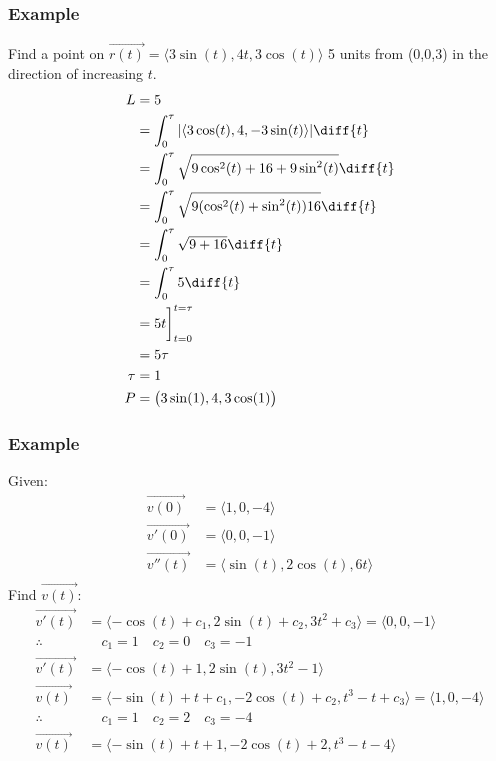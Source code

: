 \documentclass{math}
\begin{document}
\subsubsection*{Example}
Find a point on \( \overrightarrow{r(t)} = \langle3\sin(t),4t,3\cos(t)
\rangle \) 5 units from (0,0,3) in the direction of increasing \( t \).
\begin{align*}
  L &= 5 \\
  &= \int_{0}^{\tau}|\langle3\cos(t),4,-3\sin(t)\rangle|\diff{t} \\
  &= \int_{0}^{\tau}\sqrt{9\cos^2(t)+16+9\sin^2(t)}\diff{t} \\
  &= \int_{0}^{\tau}\sqrt{9(\cos^2(t)+\sin^2(t))16}\diff{t} \\
  &= \int_{0}^{\tau}\sqrt{9+16}\diff{t} \\
  &= \int_{0}^{\tau}5\diff{t} \\
  &= 5t\bigg]_{t=0}^{t=\tau} \\
  &= 5\tau \\
  \tau &= 1 \\
  P &= \big(3\sin(1),4,3\cos(1)\big)
\end{align*}

\subsubsection*{Example}
Given:
\begin{align*}
  \overrightarrow{v(0)} &= \langle1,0,-4\rangle \\
  \overrightarrow{v'(0)} &= \langle0,0,-1\rangle \\
  \overrightarrow{v''(t)} &= \langle\sin(t),2\cos(t),6t\rangle \\
\end{align*}
Find \( \overrightarrow{v(t)} \):
\begin{align*}
  \overrightarrow{v'(t)} &= \langle-\cos(t)+c_1,2\sin(t)+c_2,3t^2+c_3
    \rangle = \langle0,0,-1\rangle \\
  \therefore & \quad c_1 = 1 \quad c_2 = 0 \quad c_3 = -1 \\
  \overrightarrow{v'(t)} &= \langle-\cos(t)+1,2\sin(t),3t^2-1\rangle \\
  \overrightarrow{v(t)} &= \langle-\sin(t)+t+c_1,-2\cos(t)+c_2,t^3-t+c_3
    \rangle = \langle1,0,-4\rangle \\
  \therefore & \quad c_1 = 1 \quad c_2 = 2 \quad c_3 = -4 \\
  \overrightarrow{v(t)} &= \langle-\sin(t)+t+1,-2\cos(t)+2,t^3-t-4\rangle
\end{align*}
\end{document}
